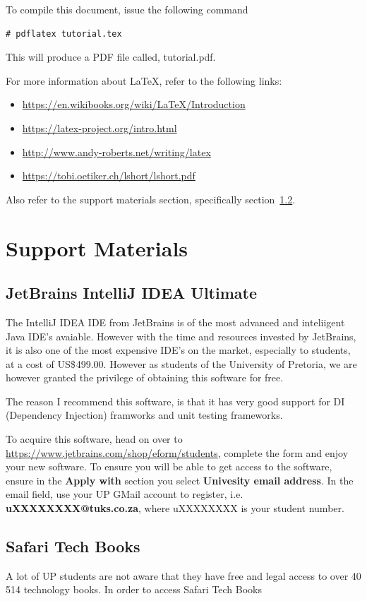 \documentclass[a4paper,10pt]{article}
\begin{document}
To compile this document, issue the following command
\begin{lstlisting}[style=TerminalStyle]
# pdflatex tutorial.tex
\end{lstlisting}

This will produce a PDF file called, tutorial.pdf.

For more information about \LaTeX{}, refer to the following links:

\begin{itemize}
\item \url{https://en.wikibooks.org/wiki/LaTeX/Introduction}
\item \url{https://latex-project.org/intro.html}
\item \url{http://www.andy-roberts.net/writing/latex}
\item \url{https://tobi.oetiker.ch/lshort/lshort.pdf}
\end{itemize}

Also refer to the support materials section, specifically section~\ref{sec:safaritechbooks}.

\section{Support Materials}
\subsection {JetBrains IntelliJ IDEA Ultimate}
The IntelliJ IDEA IDE from JetBrains is of the most advanced and inteliigent Java IDE's avaiable.  However with the time and resources invested by JetBrains, it is also one of the most expensive IDE's on the market, especially to students, at a cost of US\$ 499.00.  However as students of the University of Pretoria, we are however granted the privilege of obtaining this software for free. 

The reason I recommend this software, is that it has very good support for DI (Dependency Injection) framworks and unit testing frameworks.

To acquire this software, head on over to \url{https://www.jetbrains.com/shop/eform/students}, complete the form and enjoy your new software. To ensure you will be able to get access to the software, ensure in the \textbf{Apply with} section you select \textbf{Univesity email address}. In the email field, use your UP GMail account to register, i.e. \textbf{uXXXXXXXX@tuks.co.za}, where uXXXXXXXX is your student number.

\subsection{Safari Tech Books}
\label{sec:safaritechbooks}
A lot of UP students are not aware that they have free and legal access to over 40 514 technology books. In order to access Safari Tech Books
\end{document}
